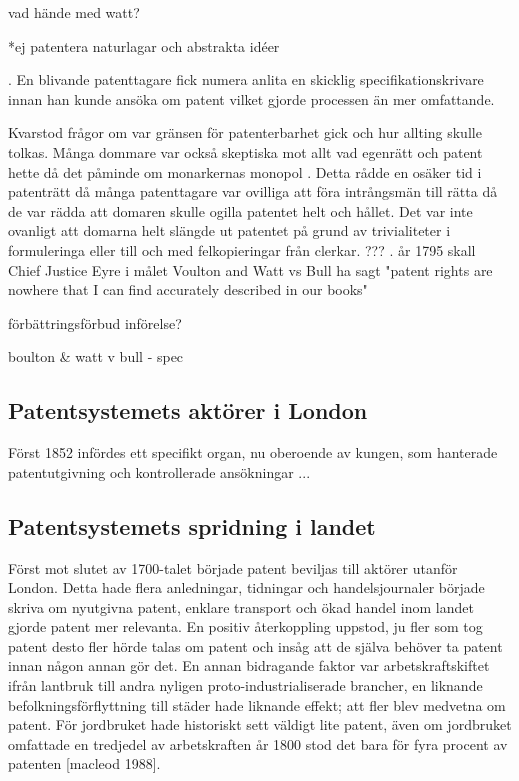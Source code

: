 vad hände med watt?

*ej patentera naturlagar och abstrakta idéer 


. En
blivande patenttagare fick numera anlita en skicklig specifikationskrivare innan han kunde ansöka om
patent vilket gjorde processen än mer omfattande.



Kvarstod frågor om var gränsen för patenterbarhet gick och hur allting skulle tolkas\cite{bracha}. Många dommare var också skeptiska mot allt vad egenrätt och patent hette då det påminde om monarkernas monopol \cite{macleod ??? }.
Detta rådde en osäker tid i patenträtt då många patenttagare var ovilliga att föra intrångsmän till
rätta då de var rädda att domaren skulle ogilla patentet helt och hållet. Det var inte ovanligt att
domarna helt slängde ut patentet på grund av trivialiteter i formuleringa eller till och med
felkopieringar från clerkar. ??? . år 1795 skall Chief Justice Eyre i målet Voulton and Watt vs Bull ha
sagt "patent rights are nowhere that I can find accurately described in our books"

förbättringsförbud införelse?

boulton & watt v bull - spec

\subsection{Patentsystemets aktörer i London} %
\label{sub:patentsystemets_uppkomst_i_london}




Först 1852 infördes ett specifikt organ, nu oberoende av kungen, som hanterade patentutgivning och kontrollerade ansökningar ...


\subsection{Patentsystemets spridning i landet} %
\label{sub:patentsystemets_spridning_i_landet}

Först mot slutet av 1700-talet började patent beviljas till aktörer utanför London. Detta hade flera
anledningar, tidningar och handelsjournaler började skriva om nyutgivna patent, enklare transport och
ökad handel inom landet gjorde patent mer relevanta. En positiv återkoppling uppstod, ju fler som tog
patent desto fler hörde talas om patent och insåg att de själva behöver ta patent innan någon annan gör
det. En annan bidragande faktor var arbetskraftskiftet ifrån lantbruk till andra nyligen
proto-industrialiserade brancher, en liknande befolkningsförflyttning till städer hade liknande effekt;
att fler blev medvetna om patent. För jordbruket hade historiskt sett väldigt lite patent, även om
jordbruket omfattade en tredjedel av arbetskraften år 1800 stod det bara för fyra procent av patenten
[macleod 1988].

